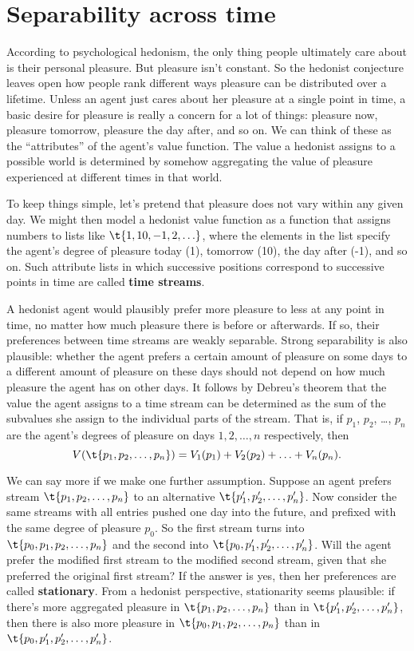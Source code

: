 {} %

\section{Separability across time}\label{sec:separability-time}

According to psychological hedonism, the only thing people ultimately
care about is their personal pleasure. But pleasure isn't constant. So
the hedonist conjecture leaves open how people rank different ways
pleasure can be distributed over a lifetime. Unless an agent just cares
about her pleasure at a single point in time, a basic desire for
pleasure is really a concern for a lot of things: pleasure now,
pleasure tomorrow, pleasure the day after, and so on. We can think of
these as the ``attributes'' of the agent's value function. The value a
hedonist assigns to a possible world is determined by somehow
aggregating the value of pleasure experienced at different times in
that world.

To keep things simple, let's pretend that pleasure does not vary
within any given day. We might then model a hedonist value function as
a function that assigns numbers to lists like $\t{1,10,-1,2,\ldots}$,
where the elements in the list specify the agent's degree of pleasure
today (1), tomorrow (10), the day after (-1), and so on. Such
attribute lists in which successive positions correspond to successive
points in time are called \textbf{time streams}.

A hedonist agent would plausibly prefer more pleasure to less at any
point in time, no matter how much pleasure there is before or
afterwards. If so, their preferences between time streams are weakly
separable. Strong separability is also plausible: whether the agent
prefers a certain amount of pleasure on some days to a different
amount of pleasure on these days should not depend on how much
pleasure the agent has on other days. It follows by Debreu's theorem
that the value the agent assigns to a time stream can be determined as
the sum of the subvalues she assign to the individual parts of the
stream. That is, if $p_1$, $p_2$, \ldots, $p_n$ are the agent's
degrees of pleasure on days $1, 2, \ldots, n$ respectively, then
\[
V(\t{p_1,p_2,\ldots,p_n}) = V_1(p_1) + V_2(p_2) + \ldots + V_n(p_n).
\]

We can say more if we make one further assumption. Suppose an agent
prefers stream $\t{p_1,p_2,\ldots,p_n}$ to an alternative
$\t{p_1',p_2',\ldots,p_n'}$. Now consider the same streams with all
entries pushed one day into the future, and prefixed with the same
degree of pleasure $p_0$. So the first stream turns into $\t{p_0,
  p_1,p_2,\ldots,p_n}$ and the second into $\t{p_0,
  p_1',p_2',\ldots,p_n'}$. Will the agent prefer the modified first
stream to the modified second stream, given that she preferred the
original first stream? If the answer is yes, then her preferences are
called \textbf{stationary}. From a hedonist perspective, stationarity
seems plausible: if there's more aggregated pleasure in
$\t{p_1,p_2,\ldots,p_n}$ than in $\t{p_1',p_2',\ldots,p_n'}$, then
there is also more pleasure in $\t{p_0,p_1,p_2,\ldots,p_n}$ than in
$\t{p_0,p_1',p_2',\ldots,p_n'}$.

